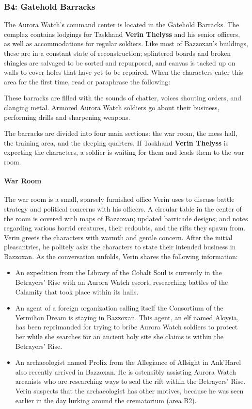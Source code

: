\documentclass[10pt,a4,twoside,twocolumn,openany,nodeprecatedcode]{dndbook}
\begin{document}
\subsubsection{B4: Gatehold Barracks}
The Aurora Watch's command center is located in the Gatehold Barracks. The complex contains lodgings for Taskhand \textbf{Verin Thelyss} and his senior officers, as well as accommodations for regular soldiers. Like most of Bazzoxan's buildings, these are in a constant state of reconstruction; splintered boards and broken shingles are salvaged to be sorted and repurposed, and canvas is tacked up on walls to cover holes that have yet to be repaired.
When the characters enter this area for the first time, read or paraphrase the following:
\begin{DndReadAloud}{}
These barracks are filled with the sounds of chatter, voices shouting orders, and clanging metal. Armored Aurora Watch soldiers go about their business, performing drills and sharpening weapons.
\end{DndReadAloud}

The barracks are divided into four main sections: the war room, the mess hall, the training area, and the sleeping quarters. If Taskhand \textbf{Verin Thelyss} is expecting the characters, a soldier is waiting for them and leads them to the war room.
\paragraph{War Room}
The war room is a small, sparsely furnished office Verin uses to discuss battle strategy and political concerns with his officers. A circular table in the center of the room is covered with maps of Bazzoxan; updated barricade designs; and notes regarding various horrid creatures, their redoubts, and the rifts they spawn from.
Verin greets the characters with warmth and gentle concern. After the initial pleasantries, he politely asks the characters to state their intended business in Bazzoxan.
As the conversation unfolds, Verin shares the following information:
\begin{itemize}

\item An expedition from the Library of the Cobalt Soul is currently in the Betrayers' Rise with an Aurora Watch escort, researching battles of the Calamity that took place within its halls.
\item An agent of a foreign organization calling itself the Consortium of the Vermilion Dream is staying in Bazzoxan. This agent, an elf named Aloysia, has been reprimanded for trying to bribe Aurora Watch soldiers to protect her while she searches for an ancient holy site she claims is within the Betrayers' Rise.
\item An archaeologist named Prolix from the Allegiance of Allsight in Ank'Harel also recently arrived in Bazzoxan. He is ostensibly assisting Aurora Watch arcanists who are researching ways to seal the rift within the Betrayers' Rise. Verin suspects that the archaeologist has other motives, because he was seen earlier in the day lurking around the crematorium (area B2).
\end{itemize}
\end{document}
